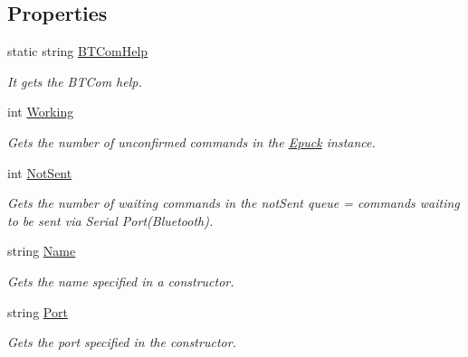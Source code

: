   \subsection*{Properties}
  \begin{DoxyCompactItemize}
  \item 
  static string \hyperlink{class_elib_1_1_epuck_a0c2ac9894699214d11d34393f4c37681}{BTComHelp}
  \begin{DoxyCompactList}\small\item\em It gets the BTCom help. \item\end{DoxyCompactList}\item 
  int \hyperlink{class_elib_1_1_epuck_af2dd18800c02f63e0c567abede754c1c}{Working}
  \begin{DoxyCompactList}\small\item\em Gets the number of unconfirmed commands in the \hyperlink{class_elib_1_1_epuck}{Epuck} instance. \item\end{DoxyCompactList}
  \item 
int \hyperlink{class_elib_1_1_epuck_a5e19ebf6190d7c3850cb5551a91e261f}{NotSent}
\begin{DoxyCompactList}\small\item\em Gets the number of waiting commands in the notSent queue = commands waiting to be sent via Serial Port(Bluetooth). \item\end{DoxyCompactList}\item 
string \hyperlink{class_elib_1_1_epuck_a33c661ddaae53d658ea4f36de2e0f835}{Name}
\begin{DoxyCompactList}\small\item\em Gets the name specified in a constructor. \item\end{DoxyCompactList}\item 
string \hyperlink{class_elib_1_1_epuck_ac267eba98589b346ef38a5ce942eff95}{Port}
\begin{DoxyCompactList}\small\item\em Gets the port specified in the constructor. \item\end{DoxyCompactList}\item 

\end{DoxyCompactItemize}
